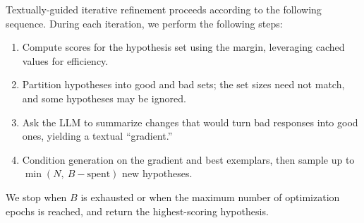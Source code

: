 \documentclass[11pt]{article}
\theoremstyle{plain}
\theoremstyle{definition}
\theoremstyle{remark}
\newcommand{\method}{SAGE}
\newcommand{\budget}{B}
\newcommand{\batchN}{N}
\begin{document}

Textually-guided iterative refinement proceeds according to the following sequence. During each iteration, we perform the following steps:
\begin{enumerate}
    \item Compute scores for the hypothesis set using the margin, leveraging cached values for efficiency.
    \item Partition hypotheses into good and bad sets; the set sizes need not match, and some hypotheses may be ignored.
    \item Ask the LLM to summarize changes that would turn bad responses into good ones, yielding a textual ``gradient.''
    \item Condition generation on the gradient and best exemplars, then sample up to \(\min(\batchN,\ \budget-\text{spent})\) new hypotheses.
\end{enumerate}
We stop when \(\budget\) is exhausted or when the maximum number of optimization epochs is reached, and return the highest-scoring hypothesis.

\end{document}
